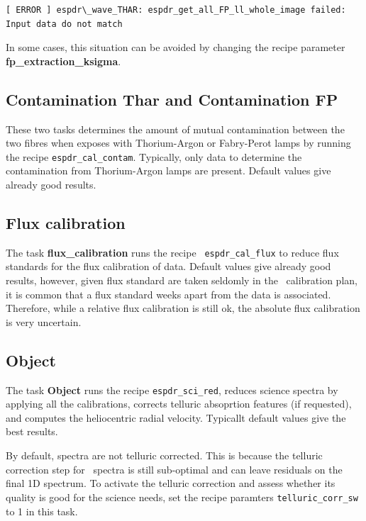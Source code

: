 \begin{verbatim}
[ ERROR ] espdr\_wave_THAR: espdr_get_all_FP_ll_whole_image failed:
Input data do not match
\end{verbatim}

In some cases, this situation can be avoided by changing the recipe
parameter {\bf fp\_extraction\_ksigma}.

\subsection{Contamination Thar and Contamination FP}

These two tasks determines the amount of mutual contamination between
the two fibres when exposes with Thorium-Argon or Fabry-Perot lamps by
running the recipe {\tt espdr\_cal\_contam}. Typically, only data to
determine the contamination from Thorium-Argon lamps are present.
Default values give already good results.

\subsection{Flux calibration}
The task {\bf flux\_calibration} runs the recipe {\tt
  espdr\_cal\_flux} to reduce flux standards for the flux calibration
of data. Default values give already good results, however, given flux
standard are taken seldomly in the \instname\ calibration plan, it is
common that a flux standard weeks apart from the data is
associated. Therefore, while a relative flux calibration is still ok,
the absolute flux calibration is very uncertain.

\subsection{Object}

The task {\bf Object} runs the recipe {\tt espdr\_sci\_red}, reduces
science spectra by applying all the calibrations, corrects telluric
absoprtion features (if requested), and computes the heliocentric
radial velocity. Typicallt default values give the best
results.

By default, spectra are not telluric corrected. This is because the
telluric correction step for \instname\ spectra is still sub-optimal and
can leave residuals on the final 1D spectrum. To activate the telluric
correction and assess whether its quality is good for the science
needs, set the recipe paramters {\tt telluric\_corr\_sw} to 1 in this
task.


